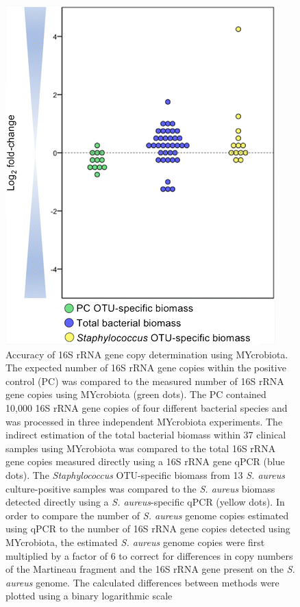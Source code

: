 \begin{figure}[t!]
\centering
\includegraphics[scale=0.5]{chapters/images/mycrobiota/mycrobiota-fig2.png}
\caption{Accuracy of 16S rRNA gene copy determination using MYcrobiota. The expected number of 16S rRNA gene copies within the positive control (PC) was compared to the measured number of 16S rRNA gene copies using MYcrobiota (green dots). The PC contained 10,000 16S rRNA gene copies of four different bacterial species and was processed in three independent MYcrobiota experiments. The indirect estimation of the total bacterial biomass within 37 clinical samples using MYcrobiota was compared to the total 16S rRNA gene copies measured directly using a 16S rRNA gene qPCR (blue dots). The \textit{Staphylococcus} OTU-specific biomass from 13 \textit{S. aureus} culture-positive samples was compared to the \textit{S. aureus} biomass detected directly using a \textit{S. aureus}-specific qPCR (yellow dots). In order to compare the number of \textit{S. aureus} genome copies estimated using qPCR to the number of 16S rRNA gene copies detected using MYcrobiota, the estimated \textit{S. aureus} genome copies were first multiplied by a factor of 6 to correct for differences in copy numbers of the Martineau fragment and the 16S rRNA gene present on the \textit{S. aureus} genome. The calculated differences between methods were plotted using a binary logarithmic scale}
\label{fig:accuracy}
\end{figure}


